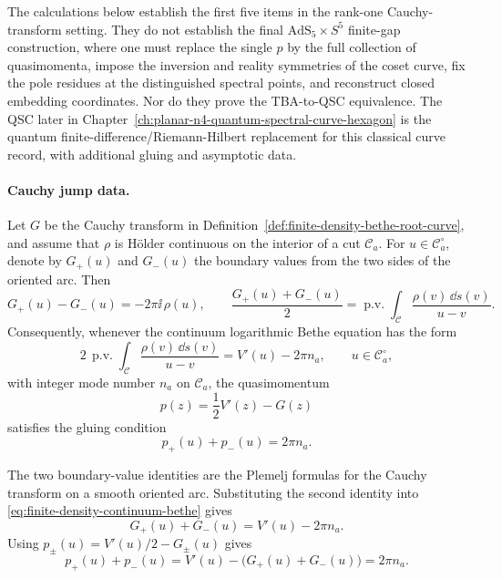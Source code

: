 The calculations below establish the first five items in the rank-one
Cauchy-transform setting.  They do not establish the final
\(\mathrm{AdS}_5\times S^5\) finite-gap construction, where one must replace the
single \(p\) by the full collection of quasimomenta, impose the inversion and
reality symmetries of the coset curve, fix the pole residues at the
distinguished spectral points, and reconstruct closed embedding coordinates.
Nor do they prove the TBA-to-QSC equivalence.  The QSC later in
Chapter~\ref{ch:planar-n4-quantum-spectral-curve-hexagon} is the quantum
finite-difference/Riemann-Hilbert replacement for this classical curve
record, with additional gluing and asymptotic data.

\paragraph{Cauchy jump data.}
Let \(G\) be the Cauchy transform in
Definition~\ref{def:finite-density-bethe-root-curve}, and assume that
\(\rho\) is Hölder continuous on the interior of a cut \(\mathcal C_a\).
For \(u\in\mathcal C_a^\circ\), denote by \(G_+(u)\) and \(G_-(u)\) the
boundary values from the two sides of the oriented arc.  Then
\begin{equation}
  G_+(u)-G_-(u)=-2\pi\ii\,\rho(u),
  \qquad
  \frac{G_+(u)+G_-(u)}2
  =
  \operatorname{p.v.}\int_{\mathcal C}
  \frac{\rho(v)\,\dd s(v)}{u-v}.
  \label{eq:finite-density-cauchy-jump}
\end{equation}
Consequently, whenever the continuum logarithmic Bethe equation has the form
\begin{equation}
  2\,\operatorname{p.v.}\int_{\mathcal C}
  \frac{\rho(v)\,\dd s(v)}{u-v}
  =
  V'(u)-2\pi n_a,\qquad u\in\mathcal C_a^\circ,
  \label{eq:finite-density-continuum-bethe}
\end{equation}
with integer mode number \(n_a\) on \(\mathcal C_a\), the quasimomentum
\begin{equation}
  p(z)=\frac12V'(z)-G(z)
  \label{eq:finite-density-quasimomentum}
\end{equation}
satisfies the gluing condition
\begin{equation}
  p_+(u)+p_-(u)=2\pi n_a .
  \label{eq:finite-density-quasimomentum-gluing}
\end{equation}

The two boundary-value identities are the Plemelj formulas for the Cauchy
transform on a smooth oriented arc.  Substituting the second identity into
\eqref{eq:finite-density-continuum-bethe} gives
\[
  G_+(u)+G_-(u)=V'(u)-2\pi n_a .
\]
Using \(p_\pm(u)=V'(u)/2-G_\pm(u)\) gives
\[
  p_+(u)+p_-(u)
  =
  V'(u)-\bigl(G_+(u)+G_-(u)\bigr)
  =
  2\pi n_a .
\]

